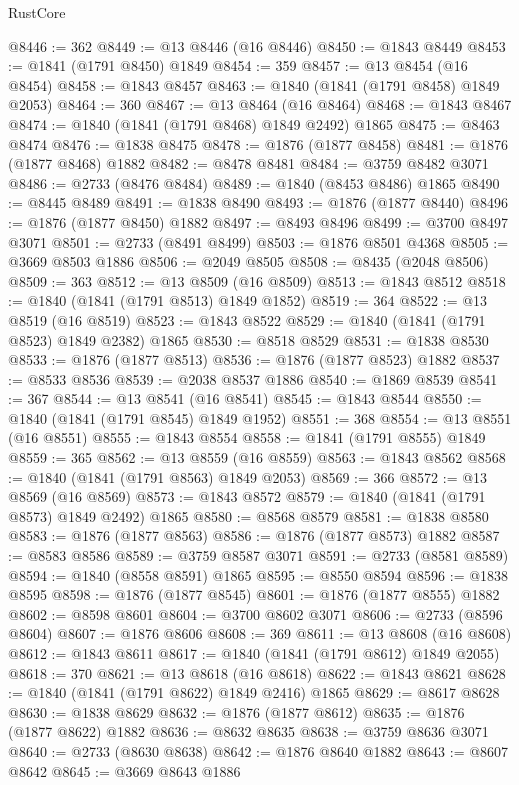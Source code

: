 \begin{lexlean}{RustCore}
\begin{coremodule}
@8446 := 362
@8449 := @13 @8446 (@16 @8446)
@8450 := @1843 @8449
@8453 := @1841 (@1791 @8450) @1849
@8454 := 359
@8457 := @13 @8454 (@16 @8454)
@8458 := @1843 @8457
@8463 := @1840 (@1841 (@1791 @8458) @1849 @2053)
@8464 := 360
@8467 := @13 @8464 (@16 @8464)
@8468 := @1843 @8467
@8474 := @1840 (@1841 (@1791 @8468) @1849 @2492) @1865
@8475 := @8463 @8474
@8476 := @1838 @8475
@8478 := @1876 (@1877 @8458)
@8481 := @1876 (@1877 @8468) @1882
@8482 := @8478 @8481
@8484 := @3759 @8482 @3071
@8486 := @2733 (@8476 @8484)
@8489 := @1840 (@8453 @8486) @1865
@8490 := @8445 @8489
@8491 := @1838 @8490
@8493 := @1876 (@1877 @8440)
@8496 := @1876 (@1877 @8450) @1882
@8497 := @8493 @8496
@8499 := @3700 @8497 @3071
@8501 := @2733 (@8491 @8499)
@8503 := @1876 @8501 @4368
@8505 := @3669 @8503 @1886
@8506 := @2049 @8505
@8508 := @8435 (@2048 @8506)
@8509 := 363
@8512 := @13 @8509 (@16 @8509)
@8513 := @1843 @8512
@8518 := @1840 (@1841 (@1791 @8513) @1849 @1852)
@8519 := 364
@8522 := @13 @8519 (@16 @8519)
@8523 := @1843 @8522
@8529 := @1840 (@1841 (@1791 @8523) @1849 @2382) @1865
@8530 := @8518 @8529
@8531 := @1838 @8530
@8533 := @1876 (@1877 @8513)
@8536 := @1876 (@1877 @8523) @1882
@8537 := @8533 @8536
@8539 := @2038 @8537 @1886
@8540 := @1869 @8539
@8541 := 367
@8544 := @13 @8541 (@16 @8541)
@8545 := @1843 @8544
@8550 := @1840 (@1841 (@1791 @8545) @1849 @1952)
@8551 := 368
@8554 := @13 @8551 (@16 @8551)
@8555 := @1843 @8554
@8558 := @1841 (@1791 @8555) @1849
@8559 := 365
@8562 := @13 @8559 (@16 @8559)
@8563 := @1843 @8562
@8568 := @1840 (@1841 (@1791 @8563) @1849 @2053)
@8569 := 366
@8572 := @13 @8569 (@16 @8569)
@8573 := @1843 @8572
@8579 := @1840 (@1841 (@1791 @8573) @1849 @2492) @1865
@8580 := @8568 @8579
@8581 := @1838 @8580
@8583 := @1876 (@1877 @8563)
@8586 := @1876 (@1877 @8573) @1882
@8587 := @8583 @8586
@8589 := @3759 @8587 @3071
@8591 := @2733 (@8581 @8589)
@8594 := @1840 (@8558 @8591) @1865
@8595 := @8550 @8594
@8596 := @1838 @8595
@8598 := @1876 (@1877 @8545)
@8601 := @1876 (@1877 @8555) @1882
@8602 := @8598 @8601
@8604 := @3700 @8602 @3071
@8606 := @2733 (@8596 @8604)
@8607 := @1876 @8606
@8608 := 369
@8611 := @13 @8608 (@16 @8608)
@8612 := @1843 @8611
@8617 := @1840 (@1841 (@1791 @8612) @1849 @2055)
@8618 := 370
@8621 := @13 @8618 (@16 @8618)
@8622 := @1843 @8621
@8628 := @1840 (@1841 (@1791 @8622) @1849 @2416) @1865
@8629 := @8617 @8628
@8630 := @1838 @8629
@8632 := @1876 (@1877 @8612)
@8635 := @1876 (@1877 @8622) @1882
@8636 := @8632 @8635
@8638 := @3759 @8636 @3071
@8640 := @2733 (@8630 @8638)
@8642 := @1876 @8640 @1882
@8643 := @8607 @8642
@8645 := @3669 @8643 @1886

\end{coremodule}
\end{lexlean}
